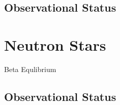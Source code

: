 \subsection{Observational Status}

\section{Neutron Stars}

Beta Equlibrium

\subsection{Observational Status}

